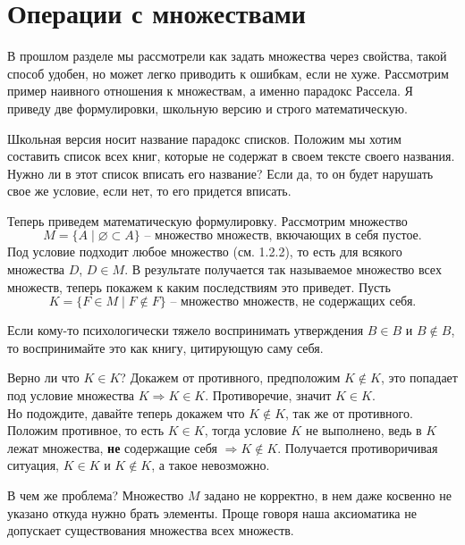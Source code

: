 \section{Операции с множествами}
В прошлом разделе мы рассмотрели как задать множества через свойства, такой способ удобен, но может легко приводить к ошибкам, если не хуже. Рассмотрим пример наивного отношения к множествам, а именно парадокс Рассела. Я приведу две формулировки, школьную версию и строго математическую.

Школьная версия носит название парадокс списков. Положим мы хотим составить список всех книг, которые не содержат в своем тексте своего названия. Нужно ли в этот список вписать его название? Если да, то он будет нарушать свое же условие, если нет, то его придется вписать.

Теперь приведем математическую формулировку. Рассмотрим множество \[M=\{A\mid \varnothing \subset A\}\text{ -- множество множеств, вкючающих в себя пустое.}\]
Под условие подходит любое множество (см. 1.2.2), то есть для всякого множества $D$, $D \in M$. В результате получается так называемое множество всех множеств, теперь покажем к каким последствиям это приведет. Пусть 
\[K=\{F\in M\mid F \notin F\}\text{ -- множество множеств, не содержащих себя.}\]
\begin{commentary}
Если кому-то психологически тяжело воспринимать утверждения $B\in B$ и $B\notin B$, то воспринимайте это как книгу, цитирующую саму себя.
\end{commentary}
Верно ли что $K\in K$? Докажем от противного, предположим $K\notin K$, это попадает под условие множества $K\Rightarrow K\in K$. Противоречие, значит $K\in K$.\\
Но подождите, давайте теперь докажем что $K\notin K$, так же от противного. Положим противное, то есть $K\in K$, тогда условие $K$ не выполнено, ведь в $K$ лежат множества, \textbf{не} содержащие себя $\Rightarrow K\notin K$. Получается противоричивая ситуация, $K\in K$ и $K\notin K$, а такое невозможно.

В чем же проблема? Множество $M$ задано не корректно, в нем даже косвенно не указано откуда нужно брать элементы. Проще говоря наша аксиоматика не допускает существования множества всех множеств.


